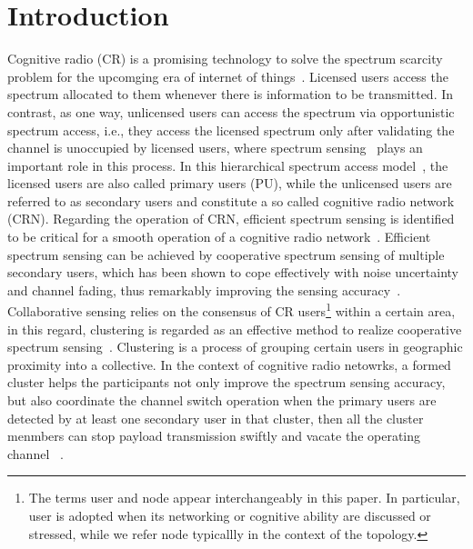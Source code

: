 \documentclass[times]{ettauth}
\newcommand{\ie}{i.e., }
\theoremstyle{mytheoremstyle}
\theoremstyle{mytheoremstyle}
\theoremstyle{mytheoremstyle}
\begin{document}

\maketitle
\graphicspath{
{../figures/04_clutering/}
}

\section{Introduction}
\label{intro}
Cognitive radio (CR) is a promising technology to solve the spectrum scarcity problem for the upcomging era of internet of things~\cite{Mitola, Rawat20161}.
Licensed users access the spectrum allocated to them whenever there is information to be transmitted.
In contrast, as one way, unlicensed users can access the spectrum via opportunistic spectrum access, \ie they access the licensed spectrum only after validating the channel is unoccupied by licensed users, where spectrum sensing~\cite{sensing_survey_2009} plays an important role in this process.
%
In this hierarchical spectrum access model~\cite{zhao_survey_DSA_2007}, the licensed users are also called primary users (PU), while the unlicensed users are referred to as secondary users and constitute a so called cognitive radio network (CRN).
%
Regarding the operation of CRN, efficient spectrum sensing is identified to be critical for a smooth operation of a cognitive radio network~\cite{Sahai_FundamentalDesignTradeoffs2006}.
Efficient spectrum sensing can be achieved by cooperative spectrum sensing of multiple secondary users, which has been shown to cope effectively with noise uncertainty and channel fading, thus remarkably improving the sensing accuracy~\cite{coorperativeSensing_Akyildiz11}.
Collaborative sensing relies on the consensus of CR users\footnote{The terms user and node appear interchangeably in this paper. In particular, user is adopted when its networking or cognitive ability are discussed or stressed, while we refer node typicallly in the context of the topology.} within a certain area, in this regard, clustering is regarded as an effective method to realize cooperative spectrum sensing~\cite{Sun07_clustering_spectrum_secsing}.
Clustering is a process of grouping certain users in geographic proximity into a collective.
In the context of cognitive radio netowrks, a formed cluster helps the participants not only improve the spectrum sensing accuracy, but also coordinate the channel switch operation when the primary users are detected by at least one secondary user in that cluster, then all the cluster menmbers can stop payload transmission swiftly and vacate the operating channel ~\cite{willkomm08}.
\end{document}
